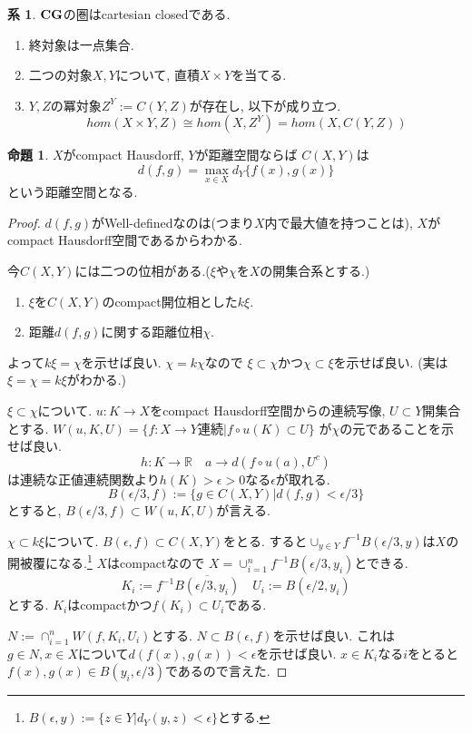 \documentclass[dvipdfmx,a4paper,11pt]{article}
\newcommand{\R}{\mathbb{R}}
\theoremstyle{definition}
\newtheorem{prop}[thm]{命題}
\newtheorem{cor}[thm]{系}
\begin{document}
 \begin{tcolorbox}
 [colback = white, colframe = green!35!black, fonttitle = \bfseries,breakable = true]
\begin{cor}\cite[Prop2.１2]{Str}
${\bf CG}$の圏はcartesian closedである. 
\begin{enumerate}
\item 終対象は一点集合. 
\item 二つの対象$X,Y$について, 直積$X \times Y$を当てる. 
\item $Y,Z$の冪対象$Z^Y :=C(Y,Z)$が存在し, 以下が成り立つ. 
$$
hom(X \times Y, Z) \cong hom(X,Z^Y)=hom(X,C(Y,Z))
$$
\end{enumerate}
\end{cor}
\end{tcolorbox}

 \begin{tcolorbox}
 [colback = white, colframe = green!35!black, fonttitle = \bfseries,breakable = true]
\begin{prop}\cite[Prop2.１3]{Str}
$X$がcompact Hausdorff, $Y$が距離空間ならば
$C(X,Y)$は
$$
d(f,g) = \max_{x \in X} d_Y\{f(x), g(x)\}
$$
という距離空間となる.
\end{prop}
\end{tcolorbox}

\begin{proof}
$d(f,g) $がWell-definedなのは(つまり$X$内で最大値を持つことは), $X$がcompact Hausdorff空間であるからわかる. 

今$C(X,Y)$には二つの位相がある.($\xi$や$\chi$を$X$の開集合系とする.)
\begin{enumerate}
\item $\xi$を$C(X,Y)$のcompact開位相とした$k \xi$.
\item 距離$d(f,g)$に関する距離位相$\chi$. 
\end{enumerate}
よって$k \xi = \chi$を示せば良い.
$\chi = k \chi$なので
$\xi \subset \chi$かつ$\chi \subset \xi$を示せば良い.
(実は$\xi = \chi = k\xi$がわかる.)

$\xi \subset \chi$について.
$u : K \to X$をcompact Hausdorff空間からの連続写像, $U \subset Y$開集合とする. 
$W(u,K,U)=
\{f : X \to Y \text{連続}| f \circ u(K) \subset U \}$
が$\chi$の元であることを示せば良い. 
$$
h : K \to \R \quad a \to d(f \circ u(a), U^c)
$$
は連続な正値連続関数より$h(K) > \epsilon >0$なる$\epsilon$が取れる. 
$$
B(\epsilon/3 , f) := \{ g \in C(X,Y) | d(f,g) < \epsilon/3\}
$$
とすると, $B(\epsilon/3 , f) \subset W(u,K,U)$が言える. 

$ \chi \subset k \xi$について. 
$B(\epsilon , f) \subset C(X,Y)$をとる. 
すると$\cup_{y \in Y}f^{-1}B(\epsilon/3 , y)$は$X$の開被覆になる.\footnote{$B(\epsilon, y) := \{ z \in Y | d_{Y}(y,z) < \epsilon\}$とする. }
$X$はcompactなので
$X = \cup_{i=1}^{n}f^{-1}B(\epsilon/3 , y_i)$とできる. 
$$
K_i := f^{-1}\overline{B(\epsilon/3 , y_i)}
\quad
U_i := B(\epsilon/2 , y_i)
$$
とする. 
$K_i$はcompactかつ$f(K_i) \subset U_i$である.

$N:= \cap_{i=1}^{n}W(f, K_i, U_i)$とする. 
$N \subset B(\epsilon , f) $を示せば良い.
これは$g \in N, x \in X$について$d(f(x),g(x))<\epsilon$を示せば良い.
$x \in K_i$なる$i$をとると$f(x), g(x) \in B(y_i , \epsilon/3)$であるので言えた.
\end{proof}
\end{document}
